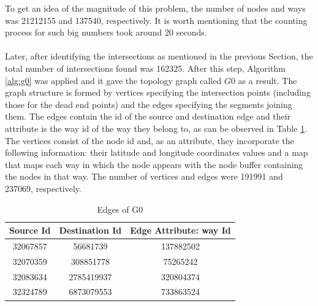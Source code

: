 To get an idea of the magnitude of this problem, the number of nodes and ways was 21212155 and 137540, respectively. It is worth mentioning that the counting process for such big numbers took around 20 seconds. 
\\
\\
Later, after identifying the intersections as mentioned in the previous Section, the total number of intersections found was 162325. After this step, Algorithm \ref{alg:g0} was applied and it gave the topology graph called $G0$ as a result. The graph structure is formed by vertices specifying the intersection points (including those for the dead end points) and the edges specifying the segments joining them. The edges contain the id of the source and destination edge and their attribute is the way id of the way they belong to, as can be observed in Table \ref{tab:edges_g0}. The vertices consist of the node id and, as an attribute, they incorporate the following information: their latitude and longitude coordinates values and a map that maps each way in which the node appears with the node buffer containing the nodes in that way. The number of vertices and edges were 191991 and 237069, respectively.

\begin{table}[H]
\centering
\begin{tabular}{|c|c|c|}
\hline
\textbf{Source Id}         & \textbf{Destination Id} & \textbf{Edge Attribute: way Id} \\ \hline
32067857                &       56681739 &   137882502 \\ \hline
32070359                &       308851778 &   75265242 \\ \hline
32083634                &       2785419937  &   320804374 \\ \hline
32324789                &       6873079553 &   733863524    \\ \hline
\end{tabular}
\captionsetup{justification=centering}
\caption{Edges of G0}
\label{tab:edges_g0}
\end{table}


